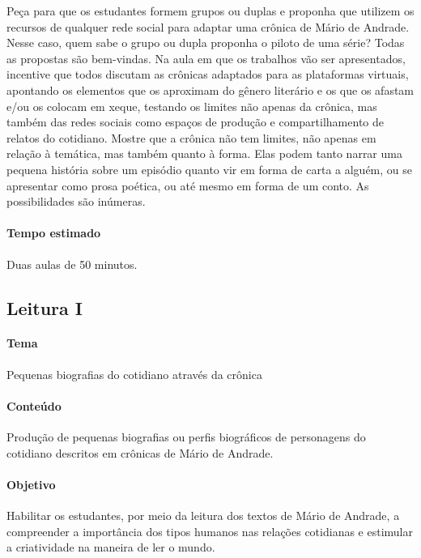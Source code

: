 \documentclass[12pt]{extarticle}
\begin{document}
Peça para que os estudantes formem grupos ou duplas e proponha que
utilizem os recursos de qualquer rede social para adaptar uma crônica de
Mário de Andrade. Nesse caso, quem sabe o grupo ou dupla proponha o
piloto de uma série? Todas as propostas são bem-vindas. Na aula em que
os trabalhos vão ser apresentados, incentive que todos discutam as
crônicas adaptados para as plataformas virtuais, apontando os elementos
que os aproximam do gênero literário e os que os afastam e/ou os colocam
em xeque, testando os limites não apenas da crônica, mas também das
redes sociais como espaços de produção e compartilhamento de relatos do
cotidiano. Mostre que a crônica não tem limites, não apenas em relação à
temática, mas também quanto à forma. Elas podem tanto narrar uma pequena
história sobre um episódio quanto vir em forma de carta a alguém, ou se
apresentar como prosa poética, ou até mesmo em forma de um conto. As
possibilidades são inúmeras.

\paragraph{Tempo estimado} Duas aulas de 50 minutos.

\subsection{Leitura I}

\paragraph{Tema} Pequenas biografias do cotidiano através da crônica
 

\paragraph{Conteúdo} Produção de pequenas biografias ou perfis biográficos
de personagens do cotidiano descritos em crônicas de Mário de Andrade.

\paragraph{Objetivo} Habilitar os estudantes, por meio da leitura dos
textos de Mário de Andrade, a compreender a importância dos tipos
humanos nas relações cotidianas e estimular a criatividade na maneira de
ler o mundo.
\end{document}

